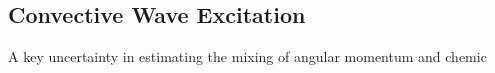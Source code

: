 {\color{purple}
\subsection{Convective Wave Excitation}
}

A key uncertainty in estimating the mixing of angular momentum and chemic
